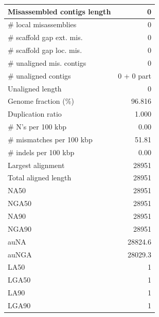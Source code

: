 \documentclass[12pt,a4paper]{article}
\begin{document}
\begin{table}[ht]
\begin{center}
\begin{tabular}{|l*{1}{|r}|}
Misassembled contigs length & 0 \\ \hline
\# local misassemblies & 0 \\ \hline
\# scaffold gap ext. mis. & 0 \\ \hline
\# scaffold gap loc. mis. & 0 \\ \hline
\# unaligned mis. contigs & 0 \\ \hline
\# unaligned contigs & 0 + 0 part \\ \hline
Unaligned length & 0 \\ \hline
Genome fraction (\%) & 96.816 \\ \hline
Duplication ratio & 1.000 \\ \hline
\# N's per 100 kbp & 0.00 \\ \hline
\# mismatches per 100 kbp & 51.81 \\ \hline
\# indels per 100 kbp & 0.00 \\ \hline
Largest alignment & 28951 \\ \hline
Total aligned length & 28951 \\ \hline
NA50 & 28951 \\ \hline
NGA50 & 28951 \\ \hline
NA90 & 28951 \\ \hline
NGA90 & 28951 \\ \hline
auNA & 28824.6 \\ \hline
auNGA & 28029.3 \\ \hline
LA50 & 1 \\ \hline
LGA50 & 1 \\ \hline
LA90 & 1 \\ \hline
LGA90 & 1 \\ \hline
\end{tabular}
\end{center}
\end{table}
\end{document}

